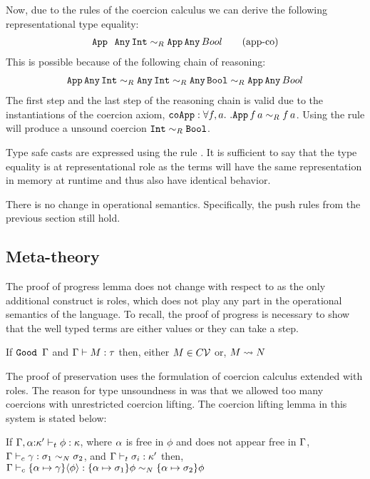 \documentclass[screen,nonacm,manuscript,review]{acmart} %
\begin{document}
Now, due to the rules of the coercion
calculus we can derive the following representational type equality:
\begin{align}\label{eqn:app-any-newtype}
  \texttt{App } \, \texttt{Any}\, \texttt{Int} \mathrel{\sim_R} \texttt{App}\,\texttt{Any} \,{Bool}\tag{app-co}
\end{align}
This is possible because of the following chain of reasoning:
\begin{align}
  \texttt{App} \App \texttt{Any}\App \texttt{Int}%
  \teqR \texttt{Any}\App \texttt{Int}%
  \teqR \texttt{Any}\App \texttt{Bool}%
  \teqR \texttt{App}\App\texttt{Any} \App{Bool}\nonumber
\end{align}
The first step and the last step of the reasoning chain is valid due to
the instantiations of the coercion axiom,
$\texttt{coApp} : \forall f,a.~. \texttt{App}\, f\, a \mathrel{\sim_R} f\, a$.
Using the rule  will produce a unsound coercion $\texttt{Int} \mathrel{\sim_R}
\texttt{Bool}$.

Type safe casts are expressed using the rule
. It is sufficient to say that the type equality
is at representational role as the terms will have
the same representation in memory at runtime and
thus also have identical behavior.

There is no change in operational semantics. Specifically, the push rules from the previous section
 still hold.

\subsection{Meta-theory}\label{sec:sfr-metatheory}
The proof of progress lemma does not change with respect to \SFC as the only
additional construct is roles, which does not play any part in the
operational semantics of the language. To recall, the proof of
progress is necessary to show that the well typed terms are either
values or they can take a step.
\begin{theorem}\label{lem:sfr-progress}
 If $\texttt{Good~}\Gamma$ and $\Gamma \vdash M : \tau$ then, either $M \in C\mathcal{V}$ or, $M \rightsquigarrow N$
\end{theorem}
The proof of preservation uses the formulation of coercion calculus
extended with roles. The reason for
type unsoundness in \SFC was that we allowed too many coercions with
unrestricted coercion lifting. The coercion lifting lemma in this system
is stated below:

\begin{lemma}\label{lem:sfr-coercion-lifting}
 If $\Gamma,\alpha{:}\kappa' \vdash_{t} \phi : \kappa$, where $\alpha$ is free in $\phi$
 and does not appear free in $\Gamma$,
 $\Gamma \vdash_{c} \gamma : \sigma_1\mathrel{\sim_N}\sigma_2$, and $\Gamma \vdash_{t} \sigma_i : \kappa'$
 then, $\Gamma \vdash_{c} \{\alpha\mapsto \gamma\}\langle{\phi}\rangle : \{\alpha\mapsto\sigma_1\}\phi\mathrel{\sim_N}\{\alpha\mapsto\sigma_2\}\phi$
\end{lemma}
\end{document}
